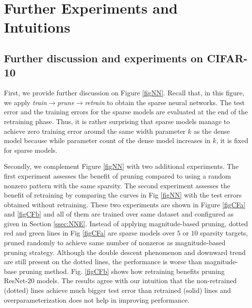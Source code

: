 \begin{figure}[t!]
\end{figure}


%
\section{Further Experiments and Intuitions}\label{SM mot}



\subsection{Further discussion and experiments on CIFAR-10} \label{ssec:SMCF}
First, we provide further discussion on Figure \ref{figNN}. Recall that, in this figure, we apply \emph{train$\rightarrow$prune$\rightarrow$retrain} to obtain the sparse neural networks. The test error and the training errors for the sparse models are evaluated at the end of the retraining phase. Thus, it is rather surprising that sparse models manage to achieve zero training error around the same width parameter $k$ as the dense model because while parameter count of the dense model increases in $k$, it is fixed for sparse models.

Secondly, we complement Figure \ref{figNN} with two additional experiments. The first experiment assesses the benefit of pruning compared to using a random nonzero pattern with the same sparsity. The second experiment assesses the benefit of retraining by comparing the curves in Fig \ref{figNN} with the test errors obtained without retraining. These two experiments are shown in Figure \ref{figCFa} and \ref{figCFb} and all of them are trained over same dataset and configured as given in Section \ref{ssec:NNE}. Instead of applying magnitude-based pruning, dotted red and green lines in Fig \ref{figCFa} are sparse models over $5$ or $10$ sparsity targets, pruned randomly to achieve same number of nonzeros as magnitude-based pruning strategy. Although the double descent phenomenon and downward trend are still present on the dotted lines, the performance is worse than magnitude-base pruning method. Fig. \ref{figCFb} shows how retraining benefits pruning ResNet-20 models. The results agree with our intuition that the non-retrained (dotted) lines achieve much bigger test error than retrained (solid) lines and overparameterization does not help in improving performance.

